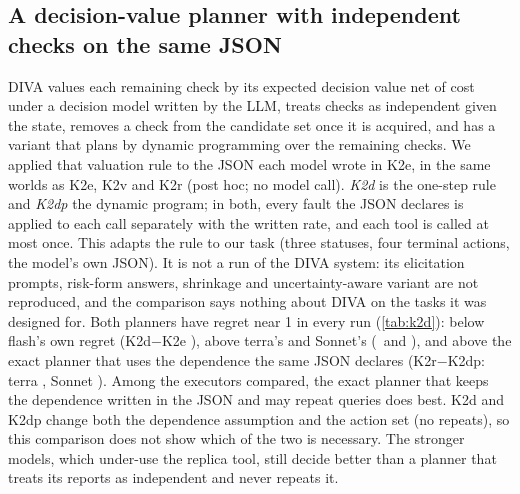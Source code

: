 \subsection{A decision-value planner with independent checks on the same JSON}\label{app:k2d}
DIVA \citep{lee2026diva} values each remaining check by its expected decision value net of cost under a decision model written by the LLM, treats checks as independent given the state, removes a check from the candidate set once it is acquired, and has a variant that plans by dynamic programming over the remaining checks.
We applied that valuation rule to the JSON each model wrote in K2e, in the same worlds as K2e, K2v and K2r (post hoc; no model call).
\emph{K2d} is the one-step rule and \emph{K2dp} the dynamic program; in both, every fault the JSON declares is applied to each call separately with the written rate, and each tool is called at most once.
This adapts the rule to our task (three statuses, four terminal actions, the model's own JSON). It is not a run of the DIVA system: its elicitation prompts, risk-form answers, shrinkage and uncertainty-aware variant are not reproduced, and the comparison says nothing about DIVA on the tasks it was designed for.
Both planners have regret near 1 in every run (\cref{tab:k2d}): below flash's own regret (K2d$-$K2e \kdFlashKTwoDmKTwoE), above terra's and Sonnet's (\kdTerraKTwoDmKTwoE\ and \kdSonnetKTwoDmKTwoE), and above the exact planner that uses the dependence the same JSON declares (K2r$-$K2dp: terra \kdTerraKTwoRmKTwoDP, Sonnet \kdSonnetKTwoRmKTwoDP).
Among the executors compared, the exact planner that keeps the dependence written in the JSON and may repeat queries does best. K2d and K2dp change both the dependence assumption and the action set (no repeats), so this comparison does not show which of the two is necessary. The stronger models, which under-use the replica tool, still decide better than a planner that treats its reports as independent and never repeats it.

\begin{table}[!htbp]
\centering
\caption{Planners on the model's own K2e JSON (CORE, $n{=}100$; mean regret per episode; paired nested 95\% intervals; post hoc). K2v: one-step value of information, dependence as written, repeats allowed. K2d / K2dp: one-step / dynamic-programming decision value with checks independent given the status and each tool called at most once. K2r: exact planner, dependence as written.}
\label{tab:k2d}
\scriptsize\setlength{\tabcolsep}{4pt}

\end{table}
